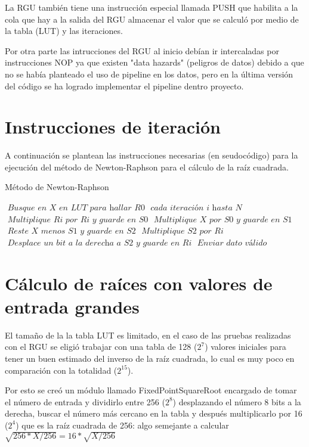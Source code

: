 La RGU también tiene una instrucción especial llamada PUSH que  habilita a la cola que hay a la salida del RGU almacenar el valor que se calculó por medio de la tabla (LUT) y las iteraciones.

Por otra parte las intrucciones del RGU al inicio debían ir intercaladas por instrucciones NOP ya que existen "data hazards" (peligros de datos) debido a que no se había planteado el uso de pipeline en los datos, pero en la última versión del código se ha logrado implementar el pipeline dentro proyecto.

\section{Instrucciones de iteración}

A continuación se plantean las instrucciones necesarias (en seudocódigo) para la ejecución del método de Newton-Raphson para el cálculo de la raíz cuadrada. 

\begin{algorithm}
\caption{Método de Newton-Raphson}\label{ray}
\begin{algorithmic}[1]
\State $\textit{ Busque en X en LUT para hallar R0}$
\For $\textit{ cada iteración i hasta N}$
\State $\textit{ Multiplique Ri por Ri y guarde en S0}$
\State $\textit{ Multiplique X por S0 y guarde en S1}$
\State $\textit{ Reste X menos S1 y guarde en S2}$
\State $\textit{ Multiplique S2 por Ri}$
\State $\textit{ Desplace un bit a la derecha a S2 y guarde en Ri}$
\EndFor
\State $\textit{ Enviar dato válido}$
\EndProcedure
\end{algorithmic}
\end{algorithm}

\section{Cálculo de raíces con valores de entrada grandes}


El tamaño de la la tabla LUT es limitado, en el caso de las pruebas realizadas con el RGU se eligió trabajar con una tabla de 128 ($2^7$) valores iniciales para tener un buen estimado del inverso de la raíz cuadrada, lo cual es muy poco en comparación con la totalidad ($2^{15}$).

Por esto se creó un módulo llamado FixedPointSquareRoot encargado de tomar el número de entrada y dividirlo entre 256 ($2^8$) desplazando el número 8 bits a la derecha, buscar el número más cercano en la tabla y después multiplicarlo por 16 ($2^4$) que es la raíz cuadrada de 256: algo semejante a calcular $\sqrt{256*X/256}=16*\sqrt{X/256}$ 

